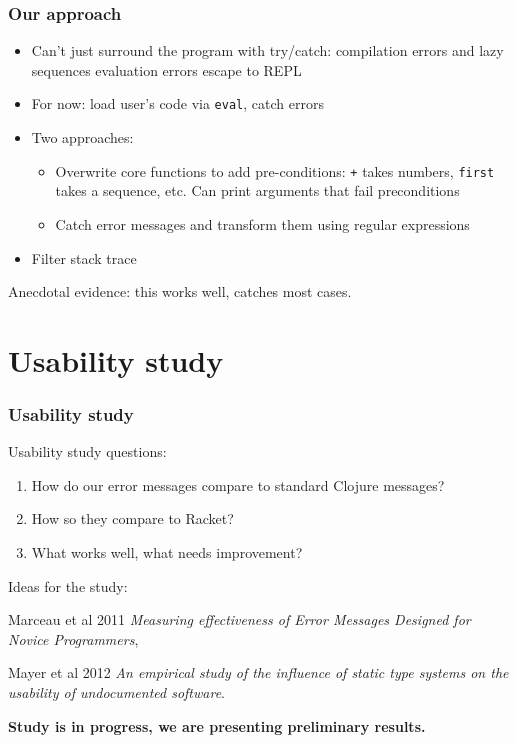 \documentclass{beamer}
\newcommand{\comment}[1]{{\bf \tt  {#1}}}
\newcommand{\emcomment}[1]{\textcolor{ForestGreen}{\comment{Elena: {#1}}}}
\begin{document}
\begin{frame}
\frametitle{Our approach}
\begin{itemize}
\item Can't just surround the program with try/catch: compilation errors and lazy sequences evaluation errors escape to REPL
\item For now: load user's code via {\tt eval}, catch errors
\item Two approaches:
	\begin{itemize}
	\item Overwrite core functions to add pre-conditions: {\tt +} takes numbers, {\tt first} takes a sequence, etc. Can print 		arguments that fail preconditions
	\item Catch error messages and transform them using regular expressions
	\end{itemize}
\item Filter stack trace
\end{itemize}
Anecdotal evidence: this works well, catches most cases. 
\end{frame}


\section{Usability study}

\begin{frame}
\frametitle{Usability study}
Usability study questions:
\begin{enumerate}
\item How do our error messages compare to standard Clojure messages?
\item How so they compare to Racket? %
\item What works well, what needs improvement? 
\end{enumerate}
Ideas for the study:

Marceau et al 2011 {\it Measuring effectiveness  of Error Messages Designed for Novice Programmers}, 

Mayer et al 2012 {\it  An empirical study of the influence of static
type systems on the usability of undocumented software}. 


{\bf Study is in progress, we are presenting preliminary results.}
\end{frame}
\end{document}
